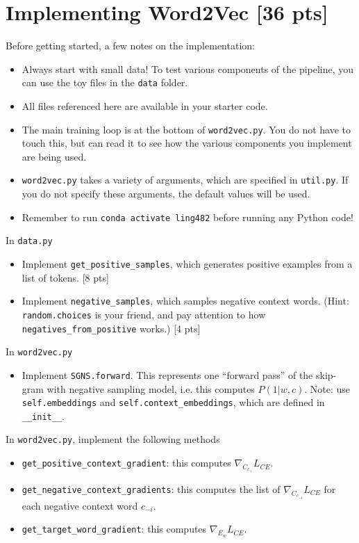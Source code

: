 \documentclass[11pt]{article}
\begin{document}
\section{Implementing Word2Vec [36 pts]}

Before getting started, a few notes on the implementation:
\begin{itemize}
  \item Always start with small data!  To test various components of the pipeline, you can use the toy files in the \texttt{data} folder.
  \item All files referenced here are available in your starter code.
  \item The main training loop is at the bottom of \texttt{word2vec.py}.  You do not have to touch this, but can read it to see how the various components you implement are being used.
  \item \texttt{word2vec.py} takes a variety of arguments, which are specified in \texttt{util.py}. If you do not specify these arguments, the default values will be used.
  \item Remember to run \texttt{conda activate ling482} before running any Python code!
\end{itemize}

\vspace{2em}
 In \texttt{data.py}
\begin{itemize}
  \item Implement \texttt{get\_positive\_samples}, which generates positive examples from a list of tokens. [8 pts]
  \item Implement \texttt{negative\_samples}, which samples negative context words.  (Hint: \texttt{random.choices} is your friend, and pay attention to how \texttt{negatives\_from\_positive} works.) [4 pts]
\end{itemize}

\vspace{2em}
 In \texttt{word2vec.py}
\begin{itemize}
  \item Implement \texttt{SGNS.forward}.  This represents one ``forward pass'' of the skip-gram with negative sampling model, i.e. this computes $P(1 | w, c)$.  Note: use \texttt{self.embeddings} and \texttt{self.context\_embeddings}, which are defined in \texttt{\_\_init\_\_}.
\end{itemize}

\vspace{2em}
 In \texttt{word2vec.py}, implement the following methods
\begin{itemize}
  \item \texttt{get\_positive\_context\_gradient}: this computes $\nabla_{C_{c_+}} L_{CE}$.
  \item \texttt{get\_negative\_context\_gradients}: this computes the list of $\nabla_{C_{c_{-i}}} L_{CE}$ for each negative context word $c_{-i}$.
  \item \texttt{get\_target\_word\_gradient}: this computes $\nabla_{E_w} L_{CE}$.
\end{itemize}
\end{document}
